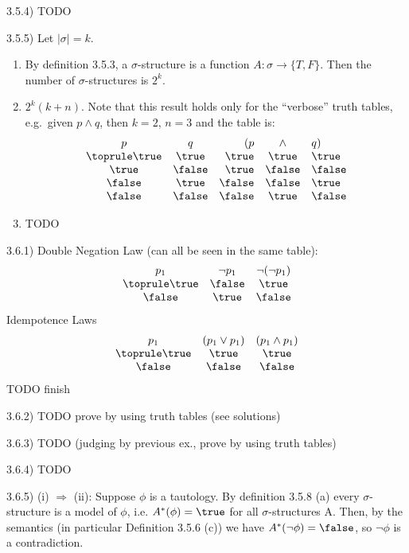 3.5.4) TODO

3.5.5) Let \(|\sigma| = k\).
\begin{enumerate}
  \item By definition 3.5.3, a \(\sigma\)-structure is a function \(A\colon
  \sigma \to \{T, F\}\). Then the number of \(\sigma\)-structures is \(2^k\).
  \item \(2^k(k+n)\). Note that this result holds only for the ``verbose''
  truth tables, e.g.\ given \(p \land q\), then \(k = 2\), \(n = 3\) and the
  table is:
    \[
      \begin{array}{ccrcl}
        p & q & (p & \land & q) \\
        \toprule
        \true  & \true  & \true  & \true  & \true \\
        \true  & \false & \true  & \false & \false \\
        \false & \true  & \false & \false & \true \\
        \false & \false & \false & \true  & \false
      \end{array}
    \]
  \item TODO
\end{enumerate}

3.6.1)
Double Negation Law (can all be seen in the same table):
    \[
      \begin{array}{ccc}
        p_1 & \neg p_1 & \neg (\neg p_1) \\
        \toprule
        \true  & \false & \true \\
        \false & \true  & \false
      \end{array}
    \]
Idempotence Laws
    \[
      \begin{array}{ccc}
        p_1 & (p_1 \lor p_1) & (p_1 \land p_1) \\
        \toprule
        \true  & \true  & \true \\
        \false & \false & \false
      \end{array}
    \]
TODO finish

3.6.2) TODO prove by using truth tables (see solutions)

3.6.3) TODO (judging by previous ex., prove by using truth tables)

3.6.4) TODO

3.6.5) (i) \(\Rightarrow\) (ii): Suppose \(\phi\) is a tautology. By definition 3.5.8 (a) every
\(\sigma\)-structure is a model of \(\phi\), i.e. \(A^*(\phi) = \true\) for
all \(\sigma\)-structures A. Then, by the semantics (in particular Definition
3.5.6 (c)) we have \(A^*(\neg \phi) = \false\), so \(\neg \phi\) is a
contradiction.

